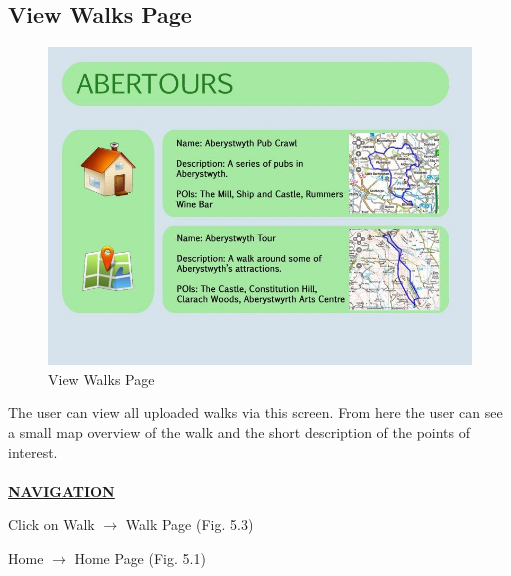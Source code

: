 \documentclass[12pt]{article}
\begin{document}
\subsection{View Walks Page}
\begin{figure}[htp]
\centering
\includegraphics[scale=0.60]{Project_Plan/Web/Your_Tours_Page_01.jpg}
\caption{View Walks Page}
\label{View Walks Page}
\end{figure}
\par{The user can view all uploaded walks via this screen. From here the user can see a small map overview of the walk and the short description of the points of interest. \\ \\}
\textbf{\uline{NAVIGATION}}
\par{Click on Walk $\rightarrow$ Walk Page (Fig. 5.3)}
\par{Home $\rightarrow$ Home Page (Fig. 5.1)}
\clearpage
\end{document}
